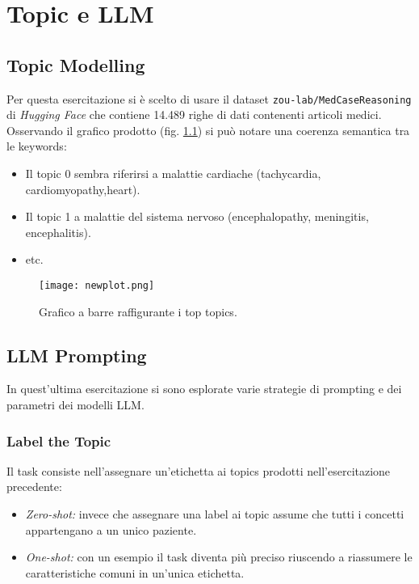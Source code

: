 \chapter{Topic e LLM}

\section{Topic Modelling}

Per questa esercitazione si è scelto di usare il dataset \texttt{zou-lab/MedCaseReasoning} di \textit{Hugging Face} che contiene 14.489 righe di dati contenenti articoli medici. Osservando il grafico prodotto (fig. \ref{fig:1}) si può notare una coerenza semantica tra le keywords:

\begin{itemize}
  \item Il topic 0 sembra riferirsi a malattie cardiache (tachycardia, cardiomyopathy,heart). 
  \item Il topic 1 a malattie del sistema nervoso (encephalopathy, meningitis, encephalitis). 
  \item etc.
\end{itemize}

\begin{figure}[h]
    \centering
    \texttt{[image: newplot.png]}
    \caption{Grafico a barre raffigurante i top topics.}
    \label{fig:1}
\end{figure}

\section{LLM Prompting}

In quest'ultima esercitazione si sono esplorate varie strategie di prompting e dei parametri dei modelli LLM.

\subsection{Label the Topic}

Il task consiste nell'assegnare un'etichetta ai topics prodotti nell'esercitazione precedente:

\begin{itemize}
  \item \textit{Zero-shot:} invece che assegnare una label ai topic assume che tutti i concetti appartengano a un unico paziente. 
  \item \textit{One-shot:} con un esempio il task diventa più preciso riuscendo a riassumere le caratteristiche comuni in un'unica etichetta.
\end{itemize}

